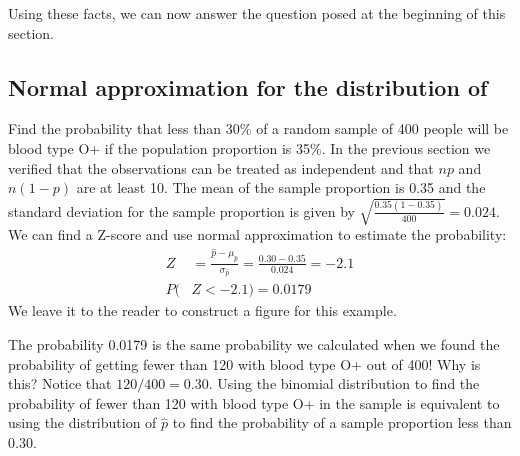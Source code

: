 Using these facts, we can now answer the question posed at the beginning of this section.



\subsection[Normal approximation for the distribution of $\hat{p}$]{Normal approximation for the distribution of }

\begin{examplewrap}
\begin{nexample}{Find the probability that less than 30\% of a random sample of 400 people will be blood type O+ if the population proportion is 35\%.}
In the previous section we verified that the observations can be treated as independent and that $np$ and $n(1-p)$ are at least 10. The mean of the sample proportion is 0.35 and the standard deviation for the sample proportion is given by $\sqrt{\frac{0.35(1-0.35)}{400}}=0.024$. We can find a Z-score and use normal approximation to estimate the probability:
\begin{align*}
Z &= \frac{\hat{p} - \mu_{\hat{p}}}{\sigma_{\hat{p}}} = \frac{0.30 - 0.35}{0.024} = -2.1 \\
P(&Z < -2.1) = 0.0179
\end{align*}
We leave it to the reader to construct a figure for this example.
\label{smokers}
\end{nexample}
\end{examplewrap}


\begin{examplewrap}
\begin{nexample}{The probability 0.0179 is the same probability we calculated when we found the probability of getting fewer than 120 with blood type O+ out of 400! Why is this?}
Notice that $120/400=0.30$. Using the binomial distribution to find the probability of fewer than 120 with blood type O+ in the sample is equivalent to using the distribution of $\hat{p}$ to find the probability of a sample proportion less than 0.30.
\end{nexample}
\end{examplewrap}


